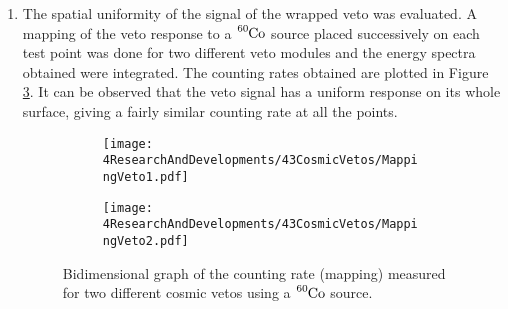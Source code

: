 \begin{enumerate}
\item{} The spatial uniformity of the signal of the wrapped veto was evaluated. A mapping of the veto response to a $\ce{^{60}Co}$ source placed successively on each test point was done for two different veto modules and the energy spectra obtained were integrated. The counting rates obtained are plotted in Figure \ref{fig:MappingVetos}. It can be observed that the veto signal has a uniform response on its whole surface, giving a fairly similar counting rate at all the points.
\begin{figure}
\centering
    \begin{subfigure}[b]{0.9\textwidth}
    \centering
    \texttt{[image: 4ResearchAndDevelopments/43CosmicVetos/MappingVeto1.pdf]}  
    \caption{\label{subfig:MappingVeto1}}
    \end{subfigure}
    \hfill
    \begin{subfigure}[b]{0.9\textwidth}
    \centering
    \texttt{[image: 4ResearchAndDevelopments/43CosmicVetos/MappingVeto2.pdf]}  
    \caption{\label{subfig:MappingVeto2}}
    \end{subfigure}
 \caption{Bidimensional graph of the counting rate (mapping) measured for two different cosmic vetos using a $\ce{^{60}Co}$ source.}
 \label{fig:MappingVetos}
\end{figure}
\end{enumerate}
